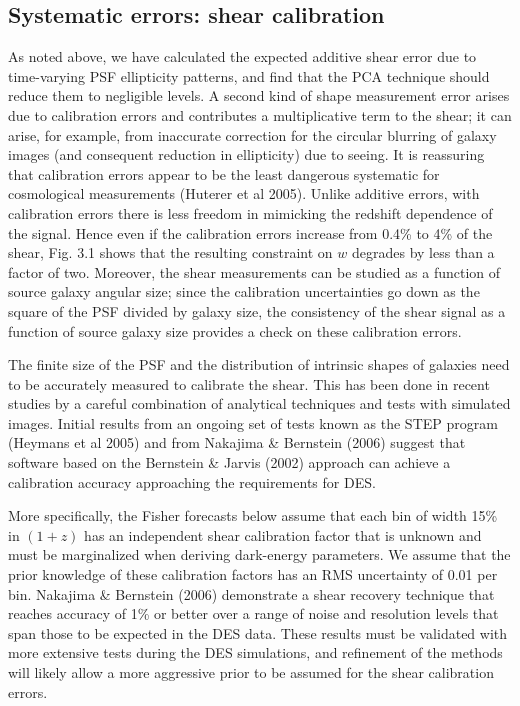 \documentclass[preprint]{aastex}
\begin{document}
\subsection{Systematic errors: shear calibration}
As noted above, we have calculated the expected additive shear error
due to time-varying PSF ellipticity patterns, and find that the PCA
technique should reduce them to negligible levels.  
A second kind of shape measurement error arises due to calibration
errors and contributes a multiplicative term to the shear; it can
arise, for example, from inaccurate correction for the circular
blurring of galaxy images (and consequent reduction in ellipticity)
due to seeing. It is reassuring that calibration errors appear to be the
least dangerous systematic for cosmological measurements (Huterer et
al 2005). Unlike additive errors, with calibration errors there is
less freedom in mimicking the redshift dependence of the signal.
Hence even if the calibration errors increase from 0.4\% to 4\% of
the shear, Fig. 3.1 shows that the resulting constraint on $w$
degrades by less than a factor of two. Moreover, the shear
measurements can be studied as a function of source galaxy angular
size; since the calibration uncertainties go down as the square of
the PSF divided by galaxy size, the consistency of the shear signal
as a function of source galaxy size provides a check on these
calibration errors.

The finite size of the PSF and the distribution of
intrinsic shapes of galaxies need to be accurately measured to
calibrate the shear. This has been done in recent studies by a
careful combination of analytical techniques and tests with
simulated images. Initial results from an ongoing set of tests known
as the STEP program (Heymans et al 2005) and from Nakajima \&
Bernstein (2006) suggest that software based
on the Bernstein \& Jarvis (2002) approach can achieve a calibration
accuracy approaching the requirements for DES.  

More specifically, the
Fisher forecasts below assume that each bin of width 15\% in $(1+z)$
has an independent shear calibration factor that is unknown and must
be marginalized when deriving dark-energy parameters.  We assume that
the prior knowledge of these calibration factors has an RMS
uncertainty of 0.01 per bin.  Nakajima \& Bernstein (2006) demonstrate
a shear recovery technique that reaches accuracy of 1\% or better over
a range of noise and resolution levels that span those to be expected
in the DES data.  These results must be validated with more extensive
tests during the DES simulations, and refinement of the methods will
likely allow a more aggressive prior to be assumed for the shear
calibration errors.
\end{document}
